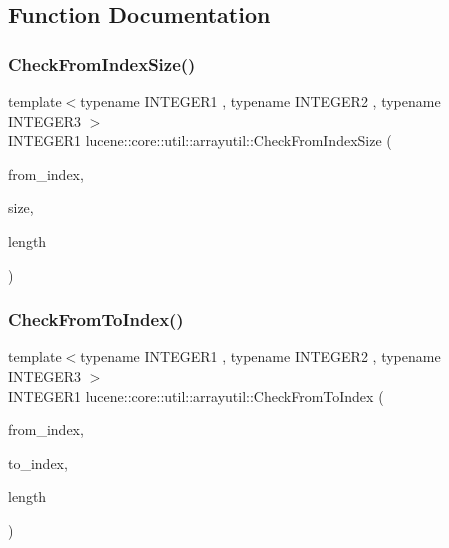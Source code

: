 \subsection{Function Documentation}
\mbox{\label{namespacelucene_1_1core_1_1util_1_1arrayutil_ae747b6a73432eb1047e4bdde1b7ccc4a}} 
\subsubsection{\texorpdfstring{Check\+From\+Index\+Size()}{CheckFromIndexSize()}}
{\footnotesize\ttfamily template$<$typename I\+N\+T\+E\+G\+E\+R1 , typename I\+N\+T\+E\+G\+E\+R2 , typename I\+N\+T\+E\+G\+E\+R3 $>$ \\
I\+N\+T\+E\+G\+E\+R1 lucene\+::core\+::util\+::arrayutil\+::\+Check\+From\+Index\+Size (\begin{DoxyParamCaption}\item[{\mbox{\hyperlink{ZlibCrc32_8h_a2c212835823e3c54a8ab6d95c652660e}{const}} I\+N\+T\+E\+G\+E\+R1}]{from\+\_\+index,  }\item[{\mbox{\hyperlink{ZlibCrc32_8h_a2c212835823e3c54a8ab6d95c652660e}{const}} I\+N\+T\+E\+G\+E\+R2}]{size,  }\item[{\mbox{\hyperlink{ZlibCrc32_8h_a2c212835823e3c54a8ab6d95c652660e}{const}} I\+N\+T\+E\+G\+E\+R3}]{length }\end{DoxyParamCaption})}

\mbox{\label{namespacelucene_1_1core_1_1util_1_1arrayutil_a18335a8c7e46732362ebbf7dedb060f9}} 
\subsubsection{\texorpdfstring{Check\+From\+To\+Index()}{CheckFromToIndex()}}
{\footnotesize\ttfamily template$<$typename I\+N\+T\+E\+G\+E\+R1 , typename I\+N\+T\+E\+G\+E\+R2 , typename I\+N\+T\+E\+G\+E\+R3 $>$ \\
I\+N\+T\+E\+G\+E\+R1 lucene\+::core\+::util\+::arrayutil\+::\+Check\+From\+To\+Index (\begin{DoxyParamCaption}\item[{\mbox{\hyperlink{ZlibCrc32_8h_a2c212835823e3c54a8ab6d95c652660e}{const}} I\+N\+T\+E\+G\+E\+R1}]{from\+\_\+index,  }\item[{\mbox{\hyperlink{ZlibCrc32_8h_a2c212835823e3c54a8ab6d95c652660e}{const}} I\+N\+T\+E\+G\+E\+R2}]{to\+\_\+index,  }\item[{\mbox{\hyperlink{ZlibCrc32_8h_a2c212835823e3c54a8ab6d95c652660e}{const}} I\+N\+T\+E\+G\+E\+R3}]{length }\end{DoxyParamCaption})}

